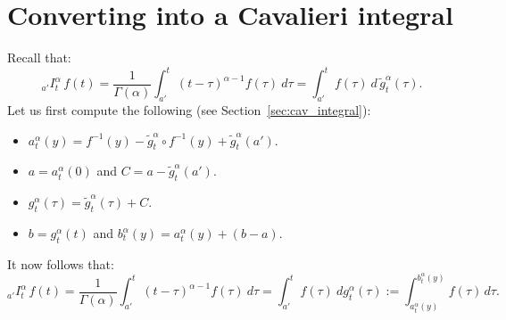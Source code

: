\documentclass[twoside,reqno,11pt]{fcaa-var} %
\begin{document}
\section{Converting into a Cavalieri integral}
\label{sec:rl_to_cav}
Recall that:
\begin{equation}
_{a'}I_t^{\alpha}\,f(t) = \frac{1}{\Gamma(\alpha)}\int_{a'}^{t}(t-\tau)^{\alpha-1}f(\tau)~d\tau = \int_{a'}^{t} f(\tau)~d\,\widetilde{g}_t^{\alpha}(\tau). 
\end{equation}
Let us first compute the following (see Section~\ref{sec:cav_integral}):
\begin{itemize}
 \item $a_t^{\alpha}(y) = f^{-1}(y) - \widetilde{g}_t^{\alpha}\circ f^{-1}(y)+ \widetilde{g}_t^{\alpha}(a')$.
 \item $a = a_t^{\alpha}(0)$ and $C = a - \widetilde{g}_t^{\alpha}(a')$.
 \item $g_t^{\alpha}(\tau) = \widetilde{g}_t^{\alpha}(\tau) + C$.
 \item $b = g_t^{\alpha}(t)$ and $b_t^{\alpha}(y) = a_t^{\alpha}(y) + (b-a)$.
\end{itemize}
It now follows that:
\begin{equation}
\label{eq:rl_to_c}
_{a'}I_t^{\alpha}\,f(t) =  \frac{1}{\Gamma(\alpha)}\int_{a'}^{t}(t-\tau)^{\alpha-1}f(\tau)~d\tau= \int_{a'}^{t} f(\tau)~dg_t^{\alpha}(\tau) := \int_{a_t^{\alpha}(y)}^{b_t^{\alpha}(y)} f(\tau)\,d\tau.
\end{equation}
\end{document}
